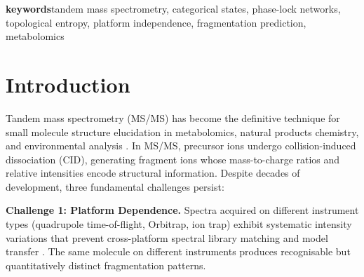 \documentclass[twocolumn,10pt,a4paper]{article}
\theoremstyle{definition}
\theoremstyle{remark}
\begin{document}
\begin{abstract}
Dual-membrane complementarity reveals that fragmentation information has intrinsic directional structure: precursor (front face) and fragments (back face) are conjugate observables that cannot be measured simultaneously. The intensity-entropy uncertainty relation $\Delta I \cdot \Delta S \geq k_{\text{frag}}$ manifests as an approximately constant uncertainty product (0.234 $\pm$ 0.042) across all fragments. Platform independence emerges naturally: categorical states encode the invariant back face (network topology) while instrument details vary the front face (measurement mechanism).

This work establishes MS/MS fragmentation as a topological information problem where entropy is network density, intensity is termination probability, and platform independence arises from categorical invariance. The dual-membrane principle unifies fragmentation theory under a single law: information has two faces that cannot be perfectly observed simultaneously, but their complementary relation enables complete reconstruction. The framework provides first-principles foundations for computational fragmentation prediction, structure elucidation, and cross-platform data integration in metabolomics.
\end{abstract}

\textbf{keywords}{tandem mass spectrometry, categorical states, phase-lock networks, topological entropy, platform independence, fragmentation prediction, metabolomics}



\section{Introduction}

Tandem mass spectrometry (MS/MS) has become the definitive technique for small molecule structure elucidation in metabolomics, natural products chemistry, and environmental analysis \cite{mclafferty1993tandem,gross2017mass}. In MS/MS, precursor ions undergo collision-induced dissociation (CID), generating fragment ions whose mass-to-charge ratios and relative intensities encode structural information. Despite decades of development, three fundamental challenges persist:

\textbf{Challenge 1: Platform Dependence.} Spectra acquired on different instrument types (quadrupole time-of-flight, Orbitrap, ion trap) exhibit systematic intensity variations that prevent cross-platform spectral library matching and model transfer \cite{stein2012mass,horai2010massbank}. The same molecule on different instruments produces recognisable but quantitatively distinct fragmentation patterns.
\end{document}
